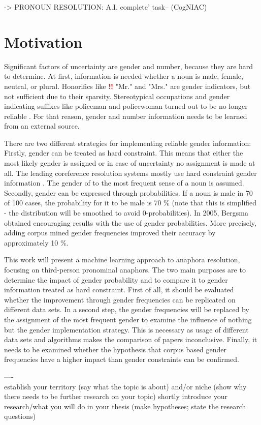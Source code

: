 -> PRONOUN RESOLUTION: A.I. complete' task-- (CogNIAC)

\section{Motivation}
Significant factors of uncertainty are gender and number, because they are hard to determine. At first, information is needed whether a noun is male, female, neutral, or plural. Honorifics like \textcolor{red}{\textbf{!!}} "Mr." and "Mrs." are gender indicators, but not sufficient due to their sparsity. Stereotypical occupations and gender indicating suffixes like policeman and policewoman turned out to be no longer reliable \citep{evans2000improving}. For that reason, gender and number information needs to be learned from an external source. 

There are two different strategies for implementing reliable gender information: \\
Firstly, gender can be treated as hard constraint. This means that either the most likely gender is assigned or in case of uncertainty no assignment is made at all. The leading coreference resolution systems mostly use hard constraint gender information \citep{soon2001machine}. The gender of to the most frequent sense of a noun is assumed.\\
Secondly, gender can be expressed through probabilities. If a noun is male in 70 of 100 cases, the probability for it to be male is 70 \% (note that this is simplified - the distribution will be smoothed to avoid 0-probabilities). In \nocite{bergsma2005automatic} 2005, Bergsma obtained encouraging results with the use of gender probabilities. More precisely, adding corpus mined gender frequencies improved their accuracy by approximately 10 \%.

This work will present a machine learning approach to anaphora resolution, focusing on third-person pronominal anaphors. The two main purposes are to determine the impact of gender probability and to compare it to gender information treated as hard constraint. First of all, it should be evaluated whether the improvement through gender frequencies can be replicated on different data sets. In a second step, the gender frequencies will be replaced by the assignment of the most frequent gender to examine the influence of nothing but the gender implementation strategy. This is necessary as usage of different data sets and algorithms makes the comparison of papers inconclusive. Finally, it needs to be examined whether the hypothesis that corpus based gender frequencies have a higher impact than gender constraints can be confirmed.




----\\
establish your territory (say what the topic is about) and/or niche (show why there needs to be further research on your topic)
shortly introduce your research/what you will do in your thesis (make hypotheses; state the research questions)



